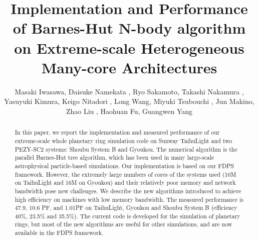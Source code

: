 \documentclass[Afour,sageh,times]{sagej}
\newcommand{\rev}[1]{{#1}}
\begin{document}

\title{Implementation and Performance of Barnes-Hut N-body algorithm  on
  Extreme-scale Heterogeneous Many-core Architectures}


\author{Masaki Iwasawa, Daisuke Namekata
, Ryo Sakamoto, Takashi Nakamura
, Yasuyuki Kimura, Keigo Nitadori
, Long Wang, Miyuki Tsubouchi
, Jun Makino, Zhao Liu
, Haohuan Fu, Guangwen Yang}




\begin{abstract}
  In this paper, we report the implementation and measured performance
  of our extreme-scale \rev{whole planetary ring} simulation code on
  Sunway TaihuLight and two PEZY-SC2 systems: Shoubu System B and
  Gyoukou. The numerical algorithm is the parallel Barnes-Hut tree
  algorithm, which has been used in many large-scale astrophysical
  particle-based simulations. Our implementation is based on our FDPS
  framework. However, the extremely large numbers of cores of the
  systems used (10M on TaihuLight and 16M on Gyoukou) and their
  relatively poor memory and network bandwidth pose new challenges. We
  describe the new algorithms introduced to achieve high efficiency on
  machines with low memory bandwidth.  The measured performance is
  47.9, 10.6 PF, and 1.01PF on TaihuLight, Gyoukou and Shoubu System B
  (efficiency 40\%, 23.5\% and 35.5\%). The current code is developed
  for the simulation of planetary rings, but most of the new
  algorithms are useful for other simulations, and are now available
  in the FDPS framework.
\end{abstract}
\end{document}
